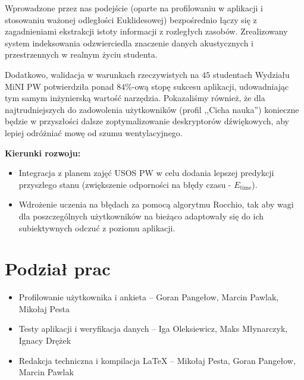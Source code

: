 \documentclass[14pt,a4paper]{extarticle}
\begin{document}
Wprowadzone przez nas podejście (oparte na profilowaniu w aplikacji i stosowaniu ważonej odległości Euklidesowej) bezpośrednio łączy się z zagadnieniami ekstrakcji istoty informacji z rozległych zasobów. Zrealizowany system indeksowania odzwierciedla znaczenie danych akustycznych i przestrzennych w realnym życiu studenta.

Dodatkowo, walidacja w warunkach rzeczywistych na $45$ studentach Wydziału MiNI PW potwierdziła ponad $84\%$-ową stopę sukcesu aplikacji, udowadniając tym samym inżynierską wartość narzędzia. Pokazaliśmy również, że dla najtrudniejszych do zadowolenia użytkowników (profil ,,Cicha nauka'') konieczne będzie w przyszłości dalsze zoptymalizowanie deskryptorów dźwiękowych, aby lepiej odróżniać mowę od szumu wentylacyjnego.

\textbf{Kierunki rozwoju:}
\begin{itemize}
    \item Integracja z planem zajęć USOS PW w celu dodania lepszej predykcji przyszłego stanu (zwiększenie odporności na błędy czasu - $E_{\text{time}}$).
    \item Wdrożenie uczenia na błędach za pomocą algorytmu Rocchio, tak aby wagi dla poszczególnych użytkowników na bieżąco adaptowały się do ich subiektywnych odczuć z poziomu aplikacji.
\end{itemize}

\section*{Podział prac}
\begin{itemize}
    \item Profilowanie użytkownika i ankieta -- Goran Pangełow, Marcin Pawlak, Mikołaj Pesta
    \item Testy aplikacji i weryfikacja danych -- Iga Oleksiewicz, Maks Młynarczyk, Ignacy Drężek
    \item Redakcja techniczna i kompilacja LaTeX -- Mikołaj Pesta, Goran Pangełow, Marcin Pawlak
\end{itemize}
\end{document}
